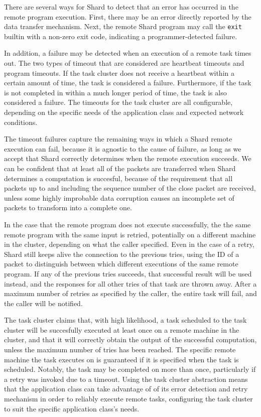 \documentclass[twoside]{report}
\begin{document}
There are several ways for Shard to detect that an error has occurred in the remote program execution.
First, there may be an error directly reported by the data transfer mechanism.
Next, the remote Shard program may call the \texttt{exit} builtin with a non-zero exit code, indicating a programmer-detected failure.

In addition, a failure may be detected when an execution of a remote task times out.
The two types of timeout that are considered are heartbeat timeouts and program timeouts.
If the task cluster does not receive a heartbeat within a certain amount of time, the task is considered a failure.
Furthermore, if the task is not completed in within a much longer period of time, the task is also considered a failure.
The timeouts for the task cluster are all configurable, depending on the specific needs of the application class and expected network conditions.

The timeout failures capture the remaining ways in which a Shard remote execution can fail, because it is agnostic to the cause of failure, as long as we accept that Shard correctly determines when the remote execution succeeds.
We can be confident that at least all of the packets are transferred when Shard determines a computation is succesful, because of the requirement that all packets up to and including the sequence number of the close packet are received, unless some highly improbable data corruption causes an incomplete set of packets to transform into a complete one.

In the case that the remote program does not execute successfully, the the same remote program with the same input is retried, potentially on a different machine in the cluster, depending on what the caller specified.
Even in the case of a retry, Shard still keeps alive the connection to the previous tries, using the ID of a packet to distinguish between which different executions of the same remote program.
If any of the previous tries succeeds, that successful result will be used instead, and the responses for all other tries of that task are thrown away.
After a maximum number of retries as specified by the caller, the entire task will fail, and the caller will be notified.

The task cluster claims that, with high likelihood, a task scheduled to the task cluster will be succesfully executed at least once on a remote machine in the cluster, and that it will correctly obtain the output of the successful computation, unless the maximum number of tries has been reached.
The specific remote machine the task executes on is guaranteed if it is specified when the task is scheduled.
Notably, the task may be completed on more than once, particularly if a retry was invoked due to a timeout.
Using the task cluster abstraction means that the application class can take advantage of of its error detection and retry mechanism in order to reliably execute remote tasks, configuring the task cluster to suit the specific application class's needs.
\end{document}
